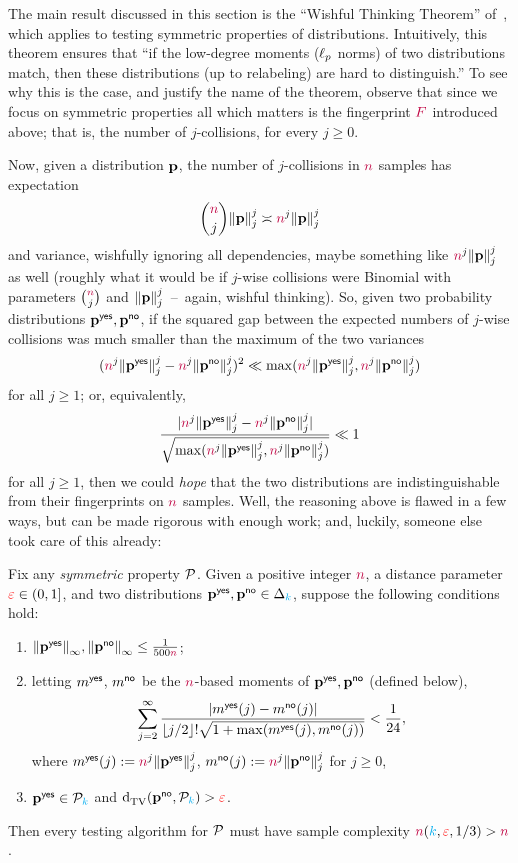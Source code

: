 The main result discussed in this section is the ``Wishful Thinking Theorem'' of~\citet{Valiant:11}, which applies to testing symmetric properties of distributions. Intuitively, this theorem ensures that ``if the low-degree moments ($\lp[p]$ norms) of two distributions match, then these distributions (up to relabeling) are hard to distinguish.'' To see why this is the case, and justify the name of the theorem, observe that since we focus on symmetric properties all which matters is the fingerprint $\freq$ introduced above; that is, the number of $j$-collisions, for every $j\geq 0$.

Now, given a distribution $\p$, the number of $j$-collisions in $\ns$ samples has expectation 
\[
	\binom{\ns}{j}\norm{\p}_j^j \asymp \ns^j\norm{\p}_j^j
\]
and variance, wishfully ignoring all dependencies, maybe something like $\ns^j\norm{\p}_j^j$ as well (roughly what it would be if $j$-wise collisions were Binomial with parameters $\binom{\ns}{j}$ and $\norm{\p}_j^j$~--~again, wishful thinking). So, given two probability distributions $\p^\yes,\p^\no$, if the squared gap between the expected numbers of $j$-wise collisions was much smaller than the maximum of the two variances
\[
		(\ns^j\norm{\p^\yes}_j^j - \ns^j\norm{\p^\no}_j^j )^2 \ll
		\max(\ns^j\norm{\p^\yes}_j^j, \ns^j\norm{\p^\no}_j^j)
\]
for all $j\geq 1$; or, equivalently, 
\[
	\frac{|\ns^j\norm{\p^\yes}_j^j - \ns^j\norm{\p^\no}_j^j|}{\sqrt{\max(\ns^j\norm{\p^\yes}_j^j, \ns^j\norm{\p^\no}_j^j)}} \ll 1
\] 
for all $j\geq 1$, then we could \emph{hope} that the two distributions are indistinguishable from their fingerprints on $\ns$ samples. Well, the reasoning above is flawed in a few ways, but can be made rigorous with enough work; and, luckily, someone else took care of this already:
\begin{theorem}\label{theo:valiant:wishful}
  Fix any \emph{symmetric} property $\property$. Given a positive integer $\ns$, a distance parameter $\dst\in(0,1]$, and two distributions $\p^\yes,\p^\no\in\distribs{\ab}$, suppose the following conditions hold:
  \begin{enumerate}
    \item $\norminf{\p^\yes},\norminf{\p^\no} \leq \frac{1}{500\ns}$;
    \item letting $m^\yes$, $m^\no$ be the $\ns$-based moments of $\p^\yes,\p^\no$ (defined below),
      \[
         \sum_{j=2}^\infty \frac{\abs{m^{\yes}(j)-m^{\no}(j)}}{\flr{j/2}!\sqrt{1+\max(m^{\yes}(j),m^{\no}(j))}} < \frac{1}{24},
      \]
      where $m^{\yes}(j) \eqdef \ns^j\norm{\p^\yes}_j^j$, $m^{\no}(j) \eqdef \ns^j\norm{\p^\no}_j^j$ for $j\geq 0$,
     \item $\p^\yes\in\property_\ab$ and $\totalvardist{\p^\no}{\property_\ab}>\dst$.
  \end{enumerate}
  Then every testing algorithm for $\property$ must have sample complexity $\ns(\ab,\dst, 1/3) > \ns$.
\end{theorem}
